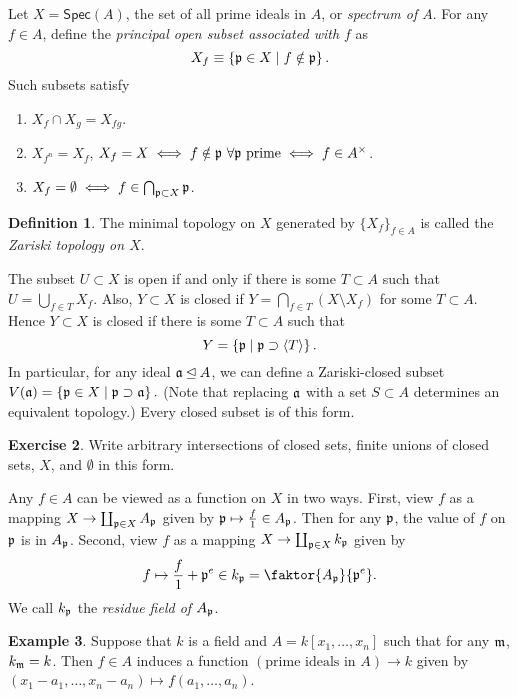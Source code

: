 \documentclass[10pt,letterpaper,cm]{nupset}
\theoremstyle{definition}
\newtheorem{definition}{Definition}[subsection]
\newtheorem{exmp}[definition]{Example}
\theoremstyle{theorem}
\newtheorem{exercise}[definition]{Exercise}
\theoremstyle{remark}
\newcommand{\1}{\mathbf{1}}
\newcommand{\p}{\frak{p}}
\newcommand{\0}{\vec 0}
\begin{document}
\medskip

 Let $X= \mathsf{Spec}(A)$, the set of all prime ideals in $A$, or \textit{spectrum of $A$}.  For any $f\in A$, define the \textit{principal open subset associated with $f$} as $$X_f \equiv \left\{ \p \in X \mid f\notin \p\right\}.$$  Such subsets satisfy 
\begin{enumerate}[label=(\alph*)]
\item $X_f \cap X_g = X_{fg}$.
\item $X_{f^n} = X_f$, $X_f = X \iff f\notin \p \ \forall \p \text{ prime} \iff f\in A^{\times}$.
\item $X_f = \emptyset \iff f \in \bigcap_{\p \subset X} \p$.
\end{enumerate}


\begin{definition}
The minimal topology on $X$ generated by $\{X_f\}_{f\in A}$ is called the \textit{Zariski topology on $X$}. 
\end{definition}


The subset $U\subset X$ is open if and only if there is some $T\subset A$ such that $U = \bigcup_{f\in T} X_f$. Also, $Y \subset X$ is closed if $Y = \bigcap_{f\in T} (X \setminus X_f)$ for some $T\subset A$.  Hence $Y \subset X$ is closed if there is some $T\subset A$ such that $$  Y = \left\{\p \mid \p \supset \langle T \rangle \right\}.$$ In particular,  for any ideal $\frak{a} \unlhd A$, we can define a Zariski-closed subset $V(\frak{a}) =  \left\{ \p \in X \mid  \p \supset \frak{a} \right\}.$ (Note that replacing $\frak{a}$ with a set $S\subset A$ determines an equivalent topology.) Every closed subset is of this form.


\begin{exercise}
Write arbitrary intersections of closed sets, finite unions of closed sets, $X$, and $\emptyset$ in this form.
\end{exercise}


Any $f\in A$ can be viewed as a function on $X$ in two ways. First, view $f$ as a mapping $X \to \coprod_{\p \in X} A_{\p}$ given by $\p \mapsto \frac{f}{1} \in A_{\p}$.  Then for any $\p$, the value of $f$ on $\p$ is in $A_{\p}$. Second, view $f$ as a mapping $X \to \coprod_{\p \in X} k_{\p}$ given by $$ f \mapsto \frac{f}{1} + \p^e \in k_{\p} = \faktor{A_{\p}}{\p^e}.$$ We call $k_{\p}$ the \textit{residue field of $A_{\p}$}. 


\begin{exmp}
Suppose that $k$ is a field and $A = k[x_1, \ldots, x_n]$ such that for any $\frak{m}$, $k_{\frak{m}} = k$. Then  $f\in A$ induces a function $\left(\text{prime ideals in } A\right) \to k$ given by $\left(x_1 -a_1, \ldots, x_n -a_n\right) \mapsto f(a_1, \ldots, a_n)$.
\end{exmp}
\end{document}
